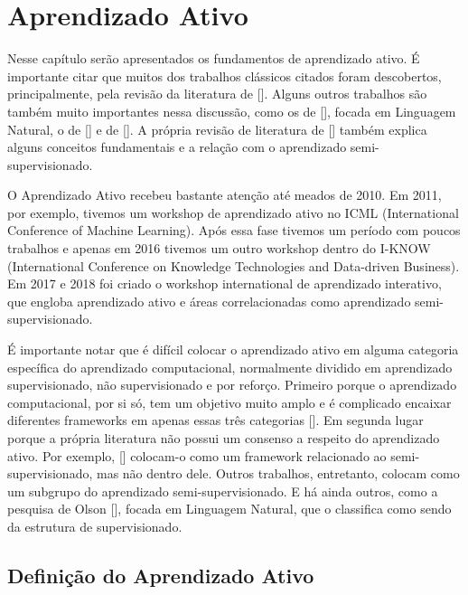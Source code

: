 \chapter{Aprendizado Ativo}
\label{cap:aprendizado_ativo}

Nesse capítulo serão apresentados os fundamentos de aprendizado ativo. É importante citar que muitos dos trabalhos clássicos citados foram descobertos, principalmente, pela revisão da literatura de [\cite{settles2012active, settles2014active}]. Alguns outros trabalhos são também muito importantes nessa discussão, como os de [\cite{olsson2009literature}], focada em Linguagem Natural, o de [\cite{aggarwal2014active}] e de [\cite{wang2011active}]. A própria revisão de literatura de [\cite{zhu2006semi}] também explica alguns conceitos fundamentais e a relação com o aprendizado semi-supervisionado.

O Aprendizado Ativo recebeu bastante atenção até meados de 2010. Em 2011, por exemplo, tivemos um workshop de aprendizado ativo no ICML (International Conference of Machine Learning). Após essa fase tivemos um período com poucos trabalhos e apenas em 2016 tivemos um outro workshop dentro do I-KNOW (International Conference on Knowledge Technologies and Data-driven Business). Em 2017 e 2018 foi criado o workshop international de aprendizado interativo, que engloba aprendizado ativo e áreas correlacionadas como aprendizado semi-supervisionado.

É importante notar que é difícil colocar o aprendizado ativo em alguma categoria específica do aprendizado computacional, normalmente dividido em aprendizado supervisionado, não supervisionado  e por reforço. Primeiro porque o aprendizado computacional, por si só, tem um objetivo muito amplo e é complicado encaixar diferentes frameworks em apenas essas três categorias [\cite{abu2012learning}]. Em segunda lugar porque a própria literatura não possui um consenso a respeito do aprendizado ativo. Por exemplo, [\cite{settles2012active, zhu2006semi}] colocam-o como um framework relacionado ao semi-supervisionado, mas não dentro dele. Outros trabalhos, entretanto, colocam como um subgrupo do aprendizado semi-supervisionado. E há ainda outros, como a pesquisa de Olson [\cite{olsson2009literature}], focada em Linguagem Natural, que o classifica como sendo da estrutura de supervisionado. 

\section{Definição do Aprendizado Ativo}
\label{sec:definicao}

